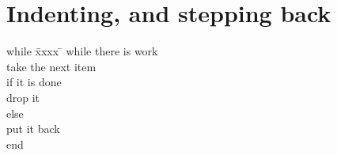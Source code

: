 \section{Indenting, and stepping back}

\begin{tabbing}
while  \= xxxx  \= \kill
while there is work \+ \\
take the next item \\
if it is done \+ \\
drop it \\
\< else \\
put it back \- \- \\
end
\end{tabbing}

